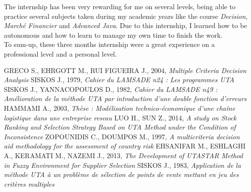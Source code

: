 \documentclass{report}
\begin{document}
The internship has been very rewarding for me on several levels, being able to practice several subjects taken during my academic years like the course \textit{Decision}, \textit{Marché Financier} and \textit{Advanced Java}. Due to this internship, I learned how to be autonomous and how to learn to manage my own time to finish the work.\\
To sum-up, these three months internship were a great experience on a professional level and a personal level.

\begin{thebibliography}{9}
 GRECO S., EHRGOTT M., RUI FIGUEIRA J., 2004, \textit{Multiple Criteria Decision Analysis}
 SISKOS J., 1979, \textit{Cahier du LAMSADE n24 : Les programmes UTA}
 SISKOS J., YANNACOPOULOS D., 1982, \textit{Cahier du LAMSADE n49 : Amélioration de la méthode UTA par introduction d’une double fonction d’erreurs}
 HAMMAMI A., 2003, \textit{Thèse : Modélisation technico-économique d’une chaîne logistique dans une entreprise reseau}
 LUO H., SUN Z., 2014, \textit{A study on Stock Ranking and Selection Strategy Based on UTA Method under the Condition of Inconsistence}
 ZOPOUNIDIS C., DOUMPOS M., 1997, \textit{A multicriteria decision aid methodology for the assessment of country risk}
 EHSANIFAR M., ESHLAGHI A., KERAMATI M., NAZEMI J., 2013, \textit{The Development of UTASTAR Method in Fuzzy Environment for Supplier Selection}
 SISKOS J., 1983, \textit{Application de la méthode UTA à un problème de sélection de points de vente mettant en jeu des critères multiples}
\end{thebibliography}

\listoffigures
{}
\end{document}
